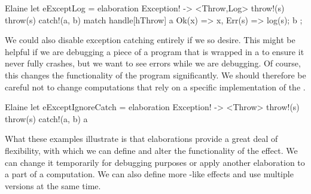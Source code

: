 \begin{lst}{Elaine}
let eExceptLog = elaboration Exception! -> <Throw,Log> {
    throw!(s) { throw(s) }
    catch!(a, b) {
        match handle[hThrow] a {
            Ok(x) => x,
            Err(s) => {
                log(s);
                b
            }
        }
    }
};
\end{lst}
%
We could also disable exception catching entirely if we so desire. This might be helpful if we are debugging a piece of a program that is wrapped in a  to ensure it never fully crashes, but we want to see errors while we are debugging. Of course, this changes the functionality of the program significantly. We should therefore be careful not to change computations that rely on a specific implementation of the .

\begin{lst}{Elaine}
let eExceptIgnoreCatch = elaboration Exception! -> <Throw> {
    throw!(s) { throw(s) }
    catch!(a, b) { a }
}
\end{lst}
%
What these examples illustrate is that elaborations provide a great deal of flexibility, with which we can define and alter the functionality of the  effect. We can change it temporarily for debugging purposes or apply another elaboration to a part of a computation. We can also define more -like effects and use multiple versions at the same time.
